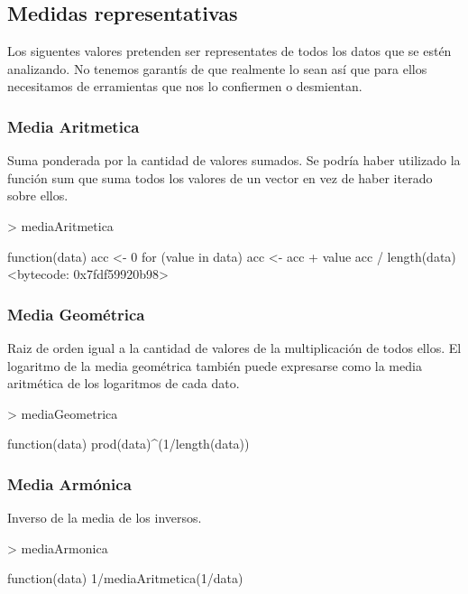\documentclass [a4paper] {article}
\begin{document}
\subsection{Medidas representativas}
Los siguentes valores pretenden ser representates de todos los datos que se estén analizando.
No tenemos garantís de que realmente lo sean así que para ellos necesitamos de erramientas que nos lo confiermen o desmientan.
\subsubsection{Media Aritmetica}
Suma ponderada por la cantidad de valores sumados.
Se podría haber utilizado la función sum que suma todos los valores de un vector en vez de haber iterado sobre ellos.
\begin{Schunk}
\begin{Sinput}
> mediaAritmetica
\end{Sinput}
\begin{Soutput}
function(data){
  acc <- 0
  for (value in data) {
    acc <- acc + value
  }
  acc / length(data)
}
<bytecode: 0x7fdf59920b98>
\end{Soutput}
\end{Schunk}
\subsubsection{Media Geométrica}
Raiz de orden igual a la cantidad de valores de la multiplicación de todos ellos.
El logaritmo de la media geométrica también puede expresarse como la media aritmética de los logaritmos de cada dato.
\begin{Schunk}
\begin{Sinput}
> mediaGeometrica
\end{Sinput}
\begin{Soutput}
function(data){
  prod(data)^(1/length(data))
}
\end{Soutput}
\end{Schunk}
\subsubsection{Media Armónica}
Inverso de la media de los inversos.
\begin{Schunk}
\begin{Sinput}
> mediaArmonica
\end{Sinput}
\begin{Soutput}
function(data){
  1/mediaAritmetica(1/data)
}
\end{Soutput}
\end{Schunk}
\end{document}
